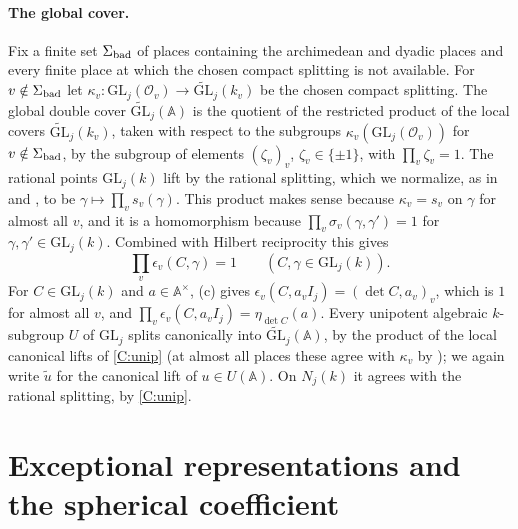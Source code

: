 \documentclass[11pt,oneside,notitlepage]{book}
\numberwithin{equation}{section}
\theoremstyle{plain}
\theoremstyle{definition}
\newcommand{\A}{\mathbb{A}}
\newcommand{\cO}{\mathcal{O}}
\newcommand{\GL}{\mathrm{GL}}
\newcommand{\tGL}{\widetilde{\GL}}
\newcommand{\hil}[2]{(#1,#2)}
\begin{document}
\paragraph{The global cover.}
Fix a finite set $\Sigma_{\rm bad}$ of places containing the archimedean and dyadic places and every finite place at which the chosen compact splitting is not available. For $v\notin\Sigma_{\rm bad}$ let $\kappa_v:\GL_j(\cO_v)\to\tGL_j(k_v)$ be the chosen compact splitting. The global double cover $\tGL_j(\A)$ is the quotient of the restricted product of the local covers $\tGL_j(k_v)$, taken with respect to the subgroups $\kappa_v(\GL_j(\cO_v))$ for $v\notin\Sigma_{\rm bad}$, by the subgroup of elements $(\zeta_v)_v$, $\zeta_v\in\{\pm1\}$, with $\prod_v\zeta_v=1$. The rational points $\GL_j(k)$ lift by the rational splitting, which we normalize, as in \cite[\S1.3]{KM} and \cite[Propositions 1.7, 1.8]{Takeda}, to be $\gamma\mapsto\prod_v s_v(\gamma)$. This product makes sense because $\kappa_v=s_v$ on $\gamma$ for almost all $v$, and it is a homomorphism because $\prod_v\sigma_v(\gamma,\gamma')=1$ for $\gamma,\gamma'\in\GL_j(k)$. Combined with Hilbert reciprocity this gives
\begin{equation}\label{eq:productformula}
	\prod_v\epsilon_v(C,\gamma)=1\qquad (C,\gamma\in\GL_j(k)).
\end{equation}
For $C\in\GL_j(k)$ and $a\in\A^\times$, (c) gives $\epsilon_v(C,a_vI_j)=\hil{\det C}{a_v}_v$, which is $1$ for almost all $v$, and $\prod_v\epsilon_v(C,a_vI_j)=\eta_{\det C}(a)$. Every unipotent algebraic $k$-subgroup $U$ of $\GL_j$ splits canonically into $\tGL_j(\A)$, by the product of the local canonical lifts of \ref{C:unip} (at almost all places these agree with $\kappa_v$ by ); we again write $\tilde u$ for the canonical lift of $u\in U(\A)$. On $N_j(k)$ it agrees with the rational splitting, by \ref{C:unip}.

\section{Exceptional representations and the spherical coefficient}\label{sec:exceptional}
\end{document}
